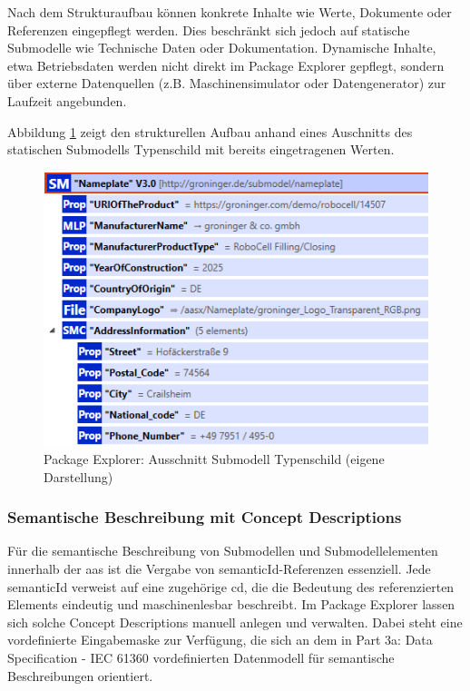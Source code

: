 Nach dem Strukturaufbau können konkrete Inhalte wie Werte, Dokumente oder Referenzen eingepflegt werden.
Dies beschränkt sich jedoch auf statische Submodelle wie Technische Daten oder Dokumentation.
Dynamische Inhalte, etwa Betriebsdaten werden nicht direkt im Package Explorer gepflegt, sondern über externe Datenquellen (z.B. Maschinensimulator oder Datengenerator) zur Laufzeit angebunden.

Abbildung \ref{fig:SubmodellTypenschild} zeigt den strukturellen Aufbau anhand eines Auschnitts des statischen Submodells Typenschild mit bereits eingetragenen Werten.

\begin{figure}[htbp]
    \centering
    \includegraphics{Bilder/ModellierungAAS/Final/SubmodellErweitert.PNG}
    \caption[Package Explorer: Ausschnitt Submodell Typenschild]{Package Explorer: Ausschnitt Submodell Typenschild (eigene Darstellung)}
    \label{fig:SubmodellTypenschild}
\end{figure}

\subsubsection*{Semantische Beschreibung mit Concept Descriptions}
\vspace{-0.5em}

Für die semantische Beschreibung von Submodellen und Submodellelementen innerhalb der \acs{aas} ist die Vergabe von semanticId-Referenzen essenziell.
Jede semanticId verweist auf eine zugehörige \acs{cd}, die die Bedeutung des referenzierten Elements eindeutig und maschinenlesbar beschreibt.
Im Package Explorer lassen sich solche Concept Descriptions manuell anlegen und verwalten.
Dabei steht eine vordefinierte Eingabemaske zur Verfügung, die sich an dem in Part 3a: Data Specification - IEC 61360 \cite{SpezifikationPart3a} vordefinierten Datenmodell für semantische Beschreibungen orientiert.

